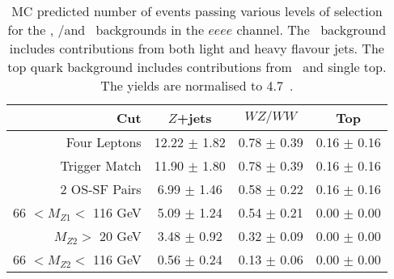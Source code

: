 \begin{table}[htbp]
  \centering
  \begin{tabular}{r|c|c|c} 
    \hline\hline
                 Cut &               $Z$+jets &             $WZ/WW$ &               Top\\ 
    \hline
        Four Leptons &  12.22 $\pm$ 1.82 & 0.78 $\pm$ 0.39 & 0.16 $\pm$ 0.16 \\ 
       Trigger Match &  11.90 $\pm$ 1.80 & 0.78 $\pm$ 0.39 & 0.16 $\pm$ 0.16 \\ 
       2 OS-SF Pairs &  6.99 $\pm$ 1.46 & 0.58 $\pm$ 0.22 & 0.16 $\pm$ 0.16 \\ 
66 $ < M_{Z1} < $ 116 GeV &  5.09 $\pm$ 1.24 & 0.54 $\pm$ 0.21 & 0.00 $\pm$ 0.00 \\ 
  $M_{Z2} > $ 20 GeV &  3.48 $\pm$ 0.92 & 0.32 $\pm$ 0.09 & 0.00 $\pm$ 0.00 \\ 
66 $ < M_{Z2} < $ 116 GeV &  0.56 $\pm$ 0.24 & 0.13 $\pm$ 0.06 & 0.00 $\pm$ 0.00 \\ 
    \hline\hline
  \end{tabular}
  \caption[MC predicted number of events passing various levels of selection for
  the \Zjets, \WZ/\WW and \topquark\ backgrounds in the $eeee$ channel.]
  {MC predicted number of events passing various levels of selection for
  the \Zjets, \WZ/\WW and \topquark\ backgrounds in the $eeee$ channel. The
  \Zjets\ background includes contributions from both light and heavy flavour
  jets. The top quark background includes contributions from \ttbar\ and
  single top. The yields are normalised to 4.7~\ifb.
  }
  \label{table:mc-bg-4e}
\end{table}

